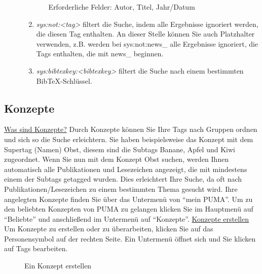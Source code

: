\begin{description}
\begin{enumerate}
\begin{enumerate}
        Erforderliche Felder: Autor, Titel, Jahr/Datum
    \end{enumerate}
    \item \textit{sys:not:<tag>} filtert die Suche, indem alle Ergebnisse ignoriert werden, die diesen Tag enthalten. An dieser Stelle können Sie auch Platzhalter verwenden, z.B. werden bei sys:not:news\_ 
    alle Ergebnisse ignoriert, die Tags enthalten, die mit news\_
    beginnen.
    \item \textit{sys:bibtexkey:<bibtexkey>} filtert die Suche nach einem bestimmten BibTeX-Schlüssel.
\end{enumerate}
\end{description}
\subsection{Konzepte}
\underline{Was sind Konzepte?}
\newline
Durch Konzepte können Sie Ihre Tags nach Gruppen ordnen und sich so die Suche erleichtern. Sie haben beispielsweise das Konzept mit dem Supertag (Namen) Obst, diesem sind die Subtags Banane, Apfel und Kiwi zugeordnet. Wenn Sie nun mit dem Konzept Obst suchen, werden Ihnen automatisch alle Publikationen und Lesezeichen angezeigt, die mit mindestens einem der Subtags getagged wurden. Dies erleichtert Ihre Suche, da oft nach Publikationen/Lesezeichen zu einem bestimmten Thema gesucht wird. 
\newline Ihre angelegten Konzepte finden Sie über das Untermenü von \enquote{mein PUMA}. Um zu den beliebten Konzepten von PUMA zu gelangen klicken Sie im Hauptmenü auf \enquote{Beliebte} und anschließend im Untermenü auf \enquote{Konzepte}. 
\newline
\newline
\underline{Konzepte erstellen}
\newline
Um Konzepte zu erstellen oder zu überarbeiten, klicken Sie auf das Personensymbol auf der rechten Seite. Ein Untermenü öffnet sich und Sie klicken auf Tags bearbeiten. 
\begin{figure}[h!]
 \centering
 \caption{Ein Konzept erstellen}
 \label{figure027}
\end{figure}
